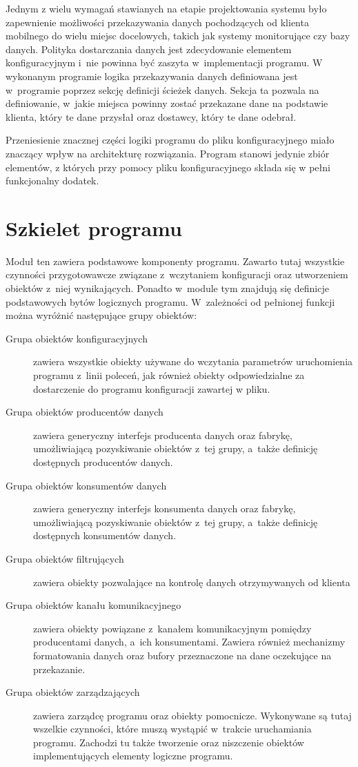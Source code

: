 Jednym z wielu wymagań stawianych na etapie projektowania systemu było
zapewnienie możliwości przekazywania danych pochodzących od klienta
mobilnego do wielu miejsc docelowych, takich jak systemy monitorujące
czy bazy danych. Polityka dostarczania danych jest zdecydowanie
elementem konfiguracyjnym i~nie powinna być zaszyta w~implementacji
programu. W wykonanym programie logika przekazywania danych
definiowana jest w~programie poprzez sekcję definicji ścieżek
danych. Sekcja ta pozwala na definiowanie, w~jakie miejsca powinny
zostać przekazane dane na podstawie klienta, który te dane przysłał
oraz dostawcy, który te dane odebrał.

Przeniesienie znacznej części logiki programu do pliku
konfiguracyjnego miało znaczący wpływ na architekturę
rozwiązania. Program stanowi jedynie zbiór elementów, z których przy
pomocy pliku konfiguracyjnego składa się w pełni funkcjonalny dodatek.

\section[Szkielet programu][Szkielet programu]{Szkielet programu}

Moduł ten zawiera podstawowe komponenty programu. Zawarto tutaj
wszystkie czynności przygotowawcze związane z~wczytaniem konfiguracji
oraz utworzeniem obiektów z~niej wynikających. Ponadto w~module tym
znajdują się definicje podstawowych bytów logicznych
programu. W~zależności od pełnionej funkcji można wyróżnić następujące
grupy obiektów:

\begin{description}
\item[Grupa obiektów konfiguracyjnych] zawiera wszystkie obiekty
  używane do wczytania parametrów uruchomienia programu z~linii
  poleceń, jak również obiekty odpowiedzialne za dostarczenie do
  programu konfiguracji zawartej w pliku.
\item[Grupa obiektów producentów danych] \raggedright{zawiera generyczny interfejs
  producenta danych oraz fabrykę, umożliwiającą pozyskiwanie obiektów
  z~tej grupy, a~także definicję dostępnych producentów danych.}
\item[Grupa obiektów konsumentów danych] zawiera generyczny interfejs
  konsumenta danych oraz fabrykę, umożliwiającą pozyskiwanie obiektów
  z~tej grupy, a~także definicję dostępnych konsumentów danych.
\item[Grupa obiektów filtrujących] zawiera obiekty pozwalające na
  kontrolę danych otrzymywanych od klienta
\item[Grupa obiektów kanału komunikacyjnego] zawiera obiekty powiązane
  z~kanałem komunikacyjnym pomiędzy producentami danych, a~ich
  konsumentami. Zawiera również mechanizmy formatowania danych oraz
  bufory przeznaczone na dane oczekujące na przekazanie.
\item[Grupa obiektów zarządzających] zawiera zarządcę programu oraz
  obiekty pomocnicze. Wykonywane są tutaj wszelkie czynności, które
  muszą wystąpić w~trakcie uruchamiania programu. Zachodzi tu także
  tworzenie oraz niszczenie obiektów implementujących elementy
  logiczne programu.
\end{description}

